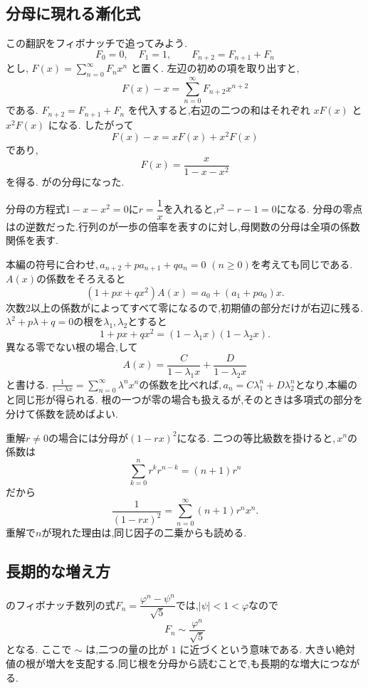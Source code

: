 \subsection{分母に現れる漸化式}
この翻訳をフィボナッチで追ってみよう.
\[
  F_0=0,\quad F_1=1,\qquad F_{n+2}=F_{n+1}+F_n
\]
とし,\,\,$F(x)=\sum_{n=0}^{\infty}F_nx^n$ と置く.
左辺の初めの項を取り出すと,
\[
  F(x)-x=\sum_{n=0}^{\infty}F_{n+2}x^{n+2}
\]
である.
 $F_{n+2}=F_{n+1}+F_n$ を代入すると,右辺の二つの和はそれぞれ $xF(x)$ と $x^2F(x)$ になる.
したがって
\[
  F(x)-x=xF(x)+x^2F(x)
\]
であり,
\[
  F(x)=\frac{x}{1-x-x^2}
\]
を得る.
がの分母になった.

分母の方程式$1-x-x^2=0$に$r=\dfrac{1}{x}$を入れると,$r^2-r-1=0$になる.
分母の零点はの逆数だった.行列のが一歩の倍率を表すのに対し,母関数の分母は全項の係数関係を表す.

本編の符号に合わせ,\,$a_{n+2}+pa_{n+1}+qa_n=0$ $(n\ge0)$を考えても同じである.
$A(x)$の係数をそろえると
\[
  (1+px+qx^2)A(x)=a_0+(a_1+pa_0)x.
\]
次数$2$以上の係数がによってすべて零になるので,初期値の部分だけが右辺に残る.
$\lambda^2+p\lambda+q=0$の根を$\lambda_1,\lambda_2$とすると
\[
  1+px+qx^2=(1-\lambda_1x)(1-\lambda_2x).
\]
異なる零でない根の場合,して
\[
  A(x)=\frac{C}{1-\lambda_1x}
       +\frac{D}{1-\lambda_2x}
\]
と書ける.
$\displaystyle \frac{1}{1-\lambda x}=\sum_{n=0}^\infty\lambda^n x^n$の係数を比べれば,\,$a_n=C\lambda_1^n+D\lambda_2^n$となり,本編のと同じ形が得られる.
根の一つが零の場合も扱えるが,そのときは多項式の部分を分けて係数を読めばよい.

重解$r\ne0$の場合には分母が$(1-rx)^2$になる.
二つの等比級数を掛けると,\,$x^n$の係数は
\[
  \sum_{k=0}^n r^k r^{n-k}=(n+1)r^n
\]
だから
\[
  \frac1{(1-rx)^2}
  =\sum_{n=0}^\infty(n+1)r^n x^n.
\]
重解で$n$が現れた理由は,同じ因子の二乗からも読める.

\subsection{長期的な増え方}
のフィボナッチ数列の式$F_n=\dfrac{\varphi^n-\psi^n}{\sqrt5}$では,$|\psi|<1<\varphi$なので
\[
  F_n\sim\frac{\varphi^n}{\sqrt5}
\]
となる.
ここで $\sim$ は,二つの量の比が $1$ に近づくという意味である.
大きい絶対値の根が増大を支配する.同じ根を分母から読むことで,も長期的な増大につながる.

